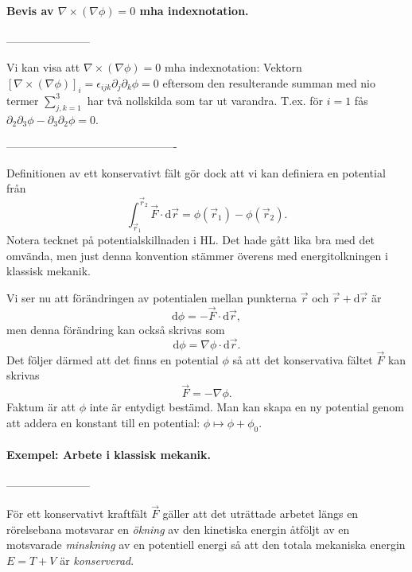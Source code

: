 \documentclass[%
oneside,                 %
final,                   %
10pt]{article}
\begin{document}
\paragraph{Bevis av $\nabla \times ( \nabla \phi) = 0$ mha indexnotation.}
-----------------------

Vi kan visa att $\nabla \times ( \nabla \phi) = 0$ mha indexnotation: Vektorn $\left[ \nabla \times ( \nabla \phi) \right]_i = \epsilon_{ijk} \partial_j \partial_k \phi = 0$ eftersom den resulterande summan med nio termer $\sum_{j,k=1}^3$ har två nollskilda som tar ut varandra. T.ex. för $i=1$ fås $\partial_2\partial_3 \phi - \partial_3\partial_2 \phi = 0$.

----------------------------------------------

Definitionen av ett konservativt fält gör dock att vi kan definiera en potential från
\begin{equation}
  \int_{\vec{r}_1}^{\vec{r}_2} \vec{F} \cdot \mbox{d} \vec{r} = \phi\left( \vec{r}_1 \right) - \phi\left( \vec{r}_2 \right).
\end{equation}
Notera tecknet på potentialskillnaden i HL. Det hade gått lika bra med det omvända, men just denna konvention stämmer överens med energitolkningen i klassisk mekanik.

Vi ser nu att förändringen av potentialen mellan punkterna $\vec{r}$ och $\vec{r} + \mbox{d}\vec{r}$ är
\begin{equation}
  \mbox{d}\phi = -\vec{F}\cdot \mbox{d}\vec{r},
\end{equation}
men denna förändring kan också skrivas som
\begin{equation}
  \mbox{d}\phi = \nabla \phi \cdot \mbox{d}\vec{r}.
\end{equation}
Det följer därmed att det finns en potential $\phi$ så att det konservativa fältet $\vec{F}$ kan skrivas
\begin{equation}
  \vec{F} = -\nabla \phi.
\end{equation}
Faktum är att $\phi$ inte är entydigt bestämd.  Man kan skapa en ny potential genom att addera en konstant till en potential: $\phi \mapsto \phi + \phi_0$.

\paragraph{Exempel: Arbete i klassisk mekanik.}
-----------------------

För ett konservativt kraftfält $\vec{F}$ gäller att det uträttade arbetet längs en rörelsebana motsvarar en \emph{ökning} av den kinetiska energin åtföljt av en motsvarade \emph{minskning} av en potentiell energi så att den totala mekaniska energin $E = T + V$ är \emph{konserverad}.
\end{document}
